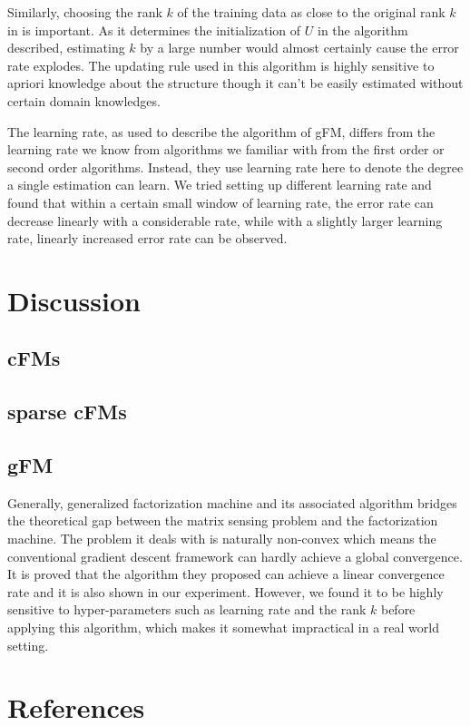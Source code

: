 \documentclass{article}
\begin{document}
Similarly, choosing the rank $k$ of the training data as close to the original rank $k$ in is important. As it determines the initialization of $U$ in the algorithm described, estimating $k$ by a large number would almost certainly cause the error rate explodes. The updating rule used in this algorithm is highly sensitive to apriori knowledge about the structure though it can't be easily estimated without certain domain knowledges.

The learning rate, as used to describe the algorithm of gFM, differs from the learning rate we know from algorithms we familiar with from the first order or second order algorithms. Instead, they use learning rate here to denote the degree a single estimation can learn. We tried setting up different learning rate and found that within a certain small window of learning rate, the error rate can decrease linearly with a considerable rate, while with a slightly larger learning rate, linearly increased error rate can be observed.



\section{Discussion}
\subsection{cFMs}

\subsection{sparse cFMs}

\subsection{gFM}
Generally, generalized factorization machine and its associated algorithm bridges the theoretical gap between the matrix sensing problem and the factorization machine. The problem it deals with is naturally non-convex which means the conventional gradient descent framework can hardly achieve a global convergence. It is proved that the algorithm they proposed can achieve a linear convergence rate and it is also shown in our experiment. However, we found it to be highly sensitive to hyper-parameters such as learning rate and the rank $k$ before applying this algorithm, which makes it somewhat impractical in a real world setting.


\section*{References}
\small{
\renewcommand{\section}[2]{}%
 

}
\end{document}
